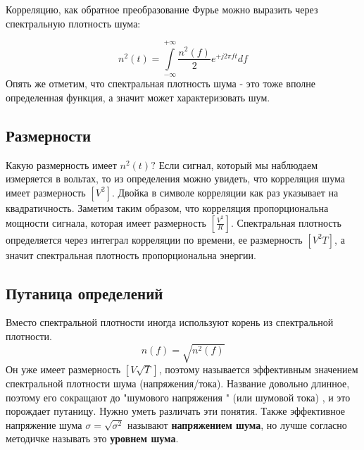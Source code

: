 \documentclass[a4paper, 12pt]{article}
\begin{document}
Корреляцию, как обратное преобразование Фурье можно выразить через спектральную плотность шума:

$$
n^2(t) = \int\limits_{-\infty}^{+\infty} \frac{n^2(f)}{2}e^{+j2\pi ft}d f
$$
Опять же отметим, что спектральная плотность шума - это тоже вполне определенная функция, а значит может характеризовать шум.

\subsection{Размерности}
Какую размерность имеет $n^2(t)?$ Если сигнал, который мы наблюдаем измеряется в вольтах, то из определения можно увидеть, что корреляция шума имеет размерность $[V^2]$. Двойка в символе корреляции как раз указывает на квадратичность. Заметим таким образом, что корреляция пропорциональна мощности сигнала, которая имеет размерность $\left[\frac{V^2}{R}\right]$. Спектральная плотность определяется через интеграл корреляции по времени, ее размерность $[V^2 T]$, а значит спектральная плотность пропорциональна энергии. 

\subsection{Путаница определений}
Вместо спектральной плотности иногда используют корень из спектральной плотности.
$$
n(f) = \sqrt{n^2(f)} 
$$
Он уже имеет размерность $\left[V\sqrt{T}\right]$, поэтому называется эффективным значением спектральной плотности шума (напряжения/тока). Название довольно длинное, поэтому его сокращают до "шумового напряжения " (или шумовой тока) , и это порождает путаницу. Нужно уметь различать эти понятия.
Также эффективное напряжение шума $\sigma = \sqrt{\sigma^2}$ называют \textbf{напряжением шума}, но лучше согласно методичке называть это \textbf{уровнем шума}.
\end{document}
